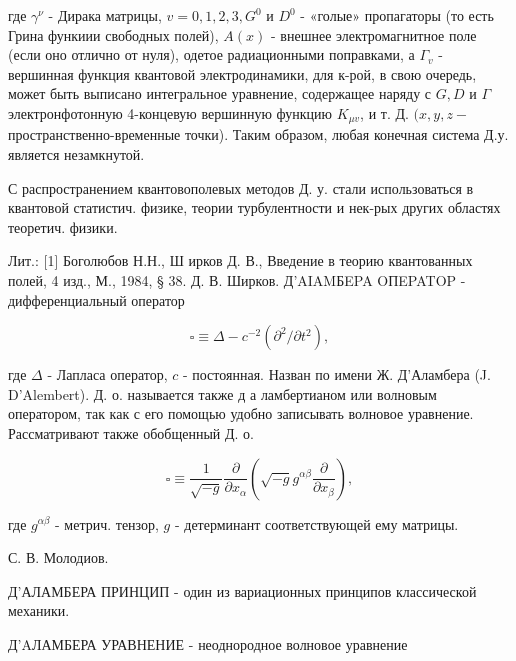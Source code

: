\documentclass[10pt]{article}
\begin{document}
где $\gamma^{\nu}$ - Дирака матрицы, $v=0,1,2,3, G^{0}$ и $D^{0}$ - «голые» пропагаторы (то есть Грина функиии свободных полей), $A(x)$ - внешнее электромагнитное поле (если оно отлично от нуля), одетое радиационными поправками, а $\Gamma_{v}$ - вершинная функция квантовой электродинамики, для к-рой, в свою очередь, может быть выписано интегральное уравнение, содержащее наряду с $G, D$ и $\Gamma$ электронфотонную 4-концевую вершинную функцию $K_{\mu v}$, и т. Д. $(x, y, z-$ пространственно-временные точки). Таким образом, любая конечная система Д.у. является незамкнутой.



С распространением квантовополевых методов Д. у. стали использоваться в квантовой статистич. физике, теории турбулентности и нек-рых других областях теоретич. физики.



Лит.: [1] Боголюбов Н.Н., Ш ирков Д. В., Введение в теорию квантованных полей, 4 изд., М., 1984, § 38. Д. В. Ширков. Д'AIAMБEPA OПEPATOP - дифференциальный оператор



\[

\square \equiv \Delta-c^{-2}\left(\partial^{2} / \partial t^{2}\right),

\]



где $\Delta$ - Лапласа оператор, $c$ - постоянная. Назван по имени Ж. Д'Аламбера (J. D'Alembert). Д. о. называется также д а ламбертианом или волновым оператором, так как с его помощью удобно записывать волновое уравнение. Рассматривают также обобщенный Д. о.



\[

\square \equiv \frac{1}{\sqrt{-g}} \frac{\partial}{\partial x_{\alpha}}\left(\sqrt{-g} g^{\alpha \beta} \frac{\partial}{\partial x_{\beta}}\right),

\]



где $g^{\alpha \beta}$ - метрич. тензор, $g$ - детерминант соответствующей ему матрицы.



С. В. Молодиов.



Д'АЛАМБЕРА ПРИНЦИП - один из вариационных принципов классической механики.



Д'AЛАМБЕРА УРАВНЕНИЕ - неоднородное волновое уравнение
\end{document}
